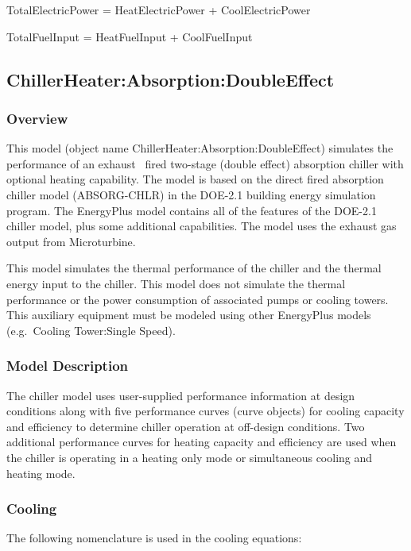 TotalElectricPower = HeatElectricPower + CoolElectricPower

TotalFuelInput = HeatFuelInput + CoolFuelInput

\subsection{ChillerHeater:Absorption:DoubleEffect}\label{chillerheaterabsorptiondoubleeffect}

\subsubsection{Overview}\label{overview-1-003}

This model (object name ChillerHeater:Absorption:DoubleEffect) simulates the performance of an exhaust~ fired two-stage (double effect) absorption chiller with optional heating capability. The model is based on the direct fired absorption chiller model (ABSORG-CHLR) in the DOE-2.1 building energy simulation program. The EnergyPlus model contains all of the features of the DOE-2.1 chiller model, plus some additional capabilities. The model uses the exhaust gas output from Microturbine.

This model simulates the thermal performance of the chiller and the thermal energy input to the chiller. This model does not simulate the thermal performance or the power consumption of associated pumps or cooling towers. This auxiliary equipment must be modeled using other EnergyPlus models (e.g.~Cooling Tower:Single Speed).

\subsubsection{Model Description}\label{model-description-1-003}

The chiller model uses user-supplied performance information at design conditions along with five performance curves (curve objects) for cooling capacity and efficiency to determine chiller operation at off-design conditions. Two additional performance curves for heating capacity and efficiency are used when the chiller is operating in a heating only mode or simultaneous cooling and heating mode.

\subsubsection{Cooling}\label{cooling-1}

The following nomenclature is used in the cooling equations:

